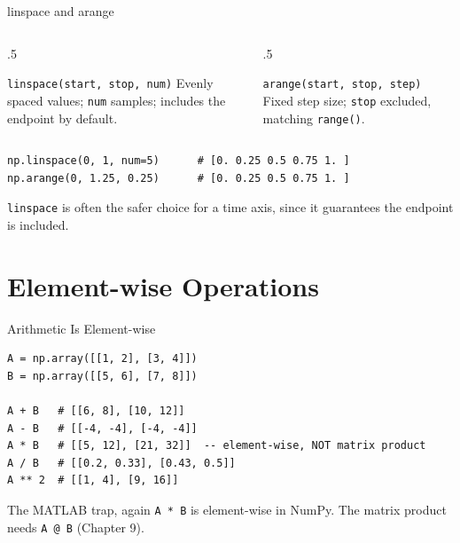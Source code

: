 \documentclass[9pt,aspectratio=169,xcolor=table]{beamer}
\begin{document}
\begin{frame}[fragile]{linspace and arange}
    \leavevmode
    \begin{columns}[t]
        \begin{column}{.5\textwidth}
            \begin{block}{\texttt{linspace(start, stop, num)}}
                \scriptsize Evenly spaced values; \texttt{num} samples;
                \alert{includes} the endpoint by default.
            \end{block}
        \end{column}
        \begin{column}{.5\textwidth}
            \begin{block}{\texttt{arange(start, stop, step)}}
                \scriptsize Fixed step size; \texttt{stop}
                \alert{excluded}, matching \texttt{range()}.
            \end{block}
        \end{column}
    \end{columns}

\begin{lstlisting}
np.linspace(0, 1, num=5)      # [0. 0.25 0.5 0.75 1. ]
np.arange(0, 1.25, 0.25)      # [0. 0.25 0.5 0.75 1. ]
\end{lstlisting}

    \vspace{1mm}
    {\small \texttt{linspace} is often the safer choice for a time axis,
    since it guarantees the endpoint is included.}
\end{frame}

\section{Element-wise Operations}

\begin{frame}[fragile]{Arithmetic Is Element-wise}
    \leavevmode
\begin{lstlisting}
A = np.array([[1, 2], [3, 4]])
B = np.array([[5, 6], [7, 8]])

A + B   # [[6, 8], [10, 12]]
A - B   # [[-4, -4], [-4, -4]]
A * B   # [[5, 12], [21, 32]]  -- element-wise, NOT matrix product
A / B   # [[0.2, 0.33], [0.43, 0.5]]
A ** 2  # [[1, 4], [9, 16]]
\end{lstlisting}

    \vspace{2mm}
    \begin{alertblock}{The MATLAB trap, again}
        \texttt{A * B} is element-wise in NumPy. The matrix product
        needs \texttt{A @ B} (Chapter 9).
    \end{alertblock}
\end{frame}
\end{document}
